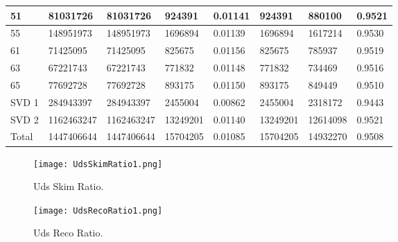 \documentclass[11pt]{article}
\begin{document}
\begin{tabular}{ | l || l | l | l | l || l | l | l |}
  51&81031726&81031726&924391&0.01141&924391&880100&0.9521\\\hline
  55&148951973&148951973&1696894&0.01139&1696894&1617214&0.9530\\\hline
  61&71425095&71425095&825675&0.01156&825675&785937&0.9519\\\hline
  63&67221743&67221743&771832&0.01148&771832&734469&0.9516\\\hline
  65&77692728&77692728&893175&0.01150&893175&849449&0.9510\\\hline
  \hline
  SVD 1&284943397&284943397&2455004&0.00862&2455004&2318172&0.9443\\\hline
  SVD 2&1162463247&1162463247&13249201&0.01140&13249201&12614098&0.9521\\\hline
  Total&1447406644&1447406644&15704205&0.01085&15704205&14932270&0.9508\\\hline
\end{tabular}


\begin{figure}[!thb]
  \centering
  \begin{minipage}[b]{0.4\textwidth}
    \texttt{[image: UdsSkimRatio1.png]}
    \caption{Uds Skim Ratio.}
  \end{minipage}
  \hfill
  \begin{minipage}[b]{0.4\textwidth}
    \texttt{[image: UdsRecoRatio1.png]}
    \caption{Uds Reco Ratio.}
  \end{minipage}
\end{figure}
\end{document}
